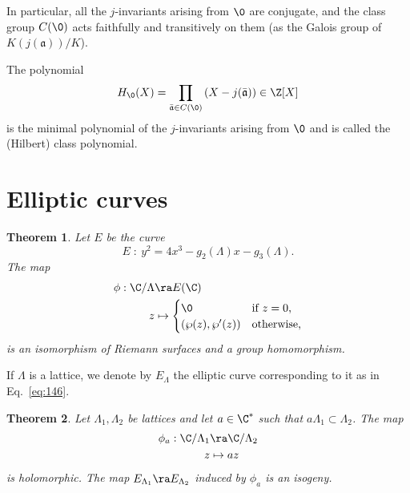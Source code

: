 \documentclass{article}
\newcommand{\mf}{\mathfrak}
\newtheorem{theorem}{Theorem}
\begin{document}
In particular, all the $j$-invariants arising from $\0$ are conjugate,
and the class group $C(\0)$ acts faithfully and transitively on them
(as the Galois group of $K(j(\mf{a}))/K$).

The polynomial
\begin{equation}
  \label{eq:7}
  H_{\0}(X) = \prod_{\bar{\mf{a}}\in C(\0)} \left(X - j(\bar{\mf{a}})\right) \in \Z[X]
\end{equation}
is the minimal polynomial of the $j$-invariants arising from $\0$ and
is called the (Hilbert) class polynomial.


\section{Elliptic curves}

\begin{theorem}
  Let $E$ be the curve 
  \begin{equation}
    \label{eq:146}
    E\;:\: y^2=4x^3-g_2(\Lambda)x-g_3(\Lambda)
    \text{.}
  \end{equation}
  The map
  \begin{equation}
    \label{eq:147}
    \begin{aligned}
      \phi: \C/\Lambda &\ra E(\C)\\
      z &\mapsto
      \begin{cases}
        \0 &\text{if $z=0$,}\\
        (\wp(z), \wp'(z)) &\text{otherwise,}
      \end{cases}
    \end{aligned}
  \end{equation}
  is an isomorphism of Riemann surfaces and a group homomorphism. 
\end{theorem}

If $\Lambda$ is a lattice, we denote by $E_\Lambda$ the elliptic curve
corresponding to it as in Eq.~\eqref{eq:146}.

\begin{theorem}
  Let $\Lambda_1,\Lambda_2$ be lattices and let $a\in\C^\ast$ such that
  $a\Lambda_1\subset\Lambda_2$. The map
  \begin{equation}
    \label{eq:148}
    \begin{aligned}
      \phi_a:\C/\Lambda_1&\ra\C/\Lambda_2\\
      z&\mapsto az
    \end{aligned}
  \end{equation}
  is holomorphic. The map $E_{\Lambda_1}\ra E_{\Lambda_2}$ induced by
  $\phi_a$ is an isogeny.
\end{theorem}
\end{document}
